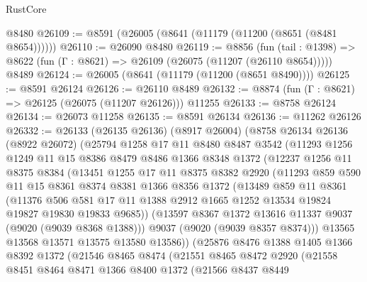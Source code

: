 \begin{lexlean}{RustCore}
\begin{coremodule}
    @8480
@26109 := @8591 (@26005 (@8641 (@11179 (@11200 (@8651 (@8481 @8654))))))
@26110 := @26090 @8480
@26119 := @8856
    (fun (tail : @1398) => @8622 (fun (Γ : @8621) => @26109 (@26075 (@11207 (@26110 @8654)))))
    @8489
@26124 := @26005 (@8641 (@11179 (@11200 (@8651 @8490))))
@26125 := @8591 @26124
@26126 := @26110 @8489
@26132 := @8874 (fun (Γ : @8621) => @26125 (@26075 (@11207 @26126))) @11255
@26133 := @8758 @26124
@26134 := @26073 @11258
@26135 := @8591 @26134
@26136 := @11262 @26126
@26332 := @26133
    (@26135 @26136)
    (@8917 @26004)
    (@8758
      @26134
      @26136
      (@8922 @26072)
      (@25794
        @1258
        @17
        @11
        @8480
        @8487
        @3542
        (@11293
          @1256
          @1249
          @11
          @15
          @8386
          @8479
          @8486
          @1366
          @8348
          @1372
          (@12237
            @1256
            @11
            @8375
            @8384
            (@13451
              @1255
              @17
              @11
              @8375
              @8382
              @2920
              (@11293
                @859
                @590
                @11
                @15
                @8361
                @8374
                @8381
                @1366
                @8356
                @1372
                (@13489
                  @859
                  @11
                  @8361
                  (@11376
                    @506
                    @581
                    @17
                    @11
                    @1388
                    @2912
                    @1665
                    @1252
                    @13534
                    @19824
                    @19827
                    @19830
                    @19833
                    @9685))
                (@13597 @8367 @1372 @13616 @11337 @9037 (@9020 (@9039 @8368 @1388)))
                @9037
                (@9020 (@9039 @8357 @8374)))
              @13565
              @13568
              @13571
              @13575
              @13580
              @13586))
          (@25876
            @8476
            @1388
            @1405
            @1366
            @8392
            @1372
            (@21546
              @8465
              @8474
              (@21551
                @8465
                @8472
                @2920
                (@21558
                  @8451
                  @8464
                  @8471
                  @1366
                  @8400
                  @1372
                  (@21566
                    @8437
                    @8449

\end{coremodule}
\end{lexlean}
